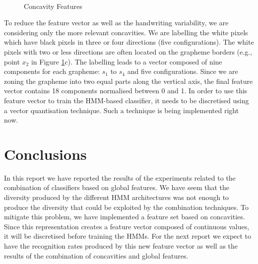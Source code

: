 \documentclass{article}[14pt, oneside, a4paper, times]
\begin{document}
 \begin {figure} [htb]
    \centering
    \mbox
        {
        \quad 
        \quad 
        }
    \caption{Concavity Features \cite{Morita2004}}
    \label{conc:fig}
\end{figure}


To reduce the feature vector as well as the handwriting variability, we are considering only the more relevant concavities. We are labelling the white pixels which have black pixels in three or four directions (five configurations). The white pixels with two or less directions are often located on the grapheme borders (e.g., point $x_2$ in Figure \ref{conc:fig}c). The labelling leads to a vector composed of nine components  for each grapheme: $s_1$ to $s_4$ and five configurations. Since we are zoning the grapheme into two equal parts along the vertical axis, the final feature vector contains 18 components normalised between 0 and 1. In order to use this feature vector to train the HMM-based classifier, it needs to be discretised using a vector quantisation technique. Such a technique is being implemented right now.

\section{Conclusions}

In this report we have reported the results of the experiments related to the combination of classifiers based on global features. We have seem that the diversity produced by the different HMM architectures was not enough to produce the diversity that could be exploited by the combination techniques. To mitigate this problem, we have implemented a feature set based on concavities. Since this representation creates a feature vector composed of continuous values, it will be discretised before training the HMMs. For the next report we expect to have the recognition rates produced by this new feature vector as well as the results of the combination of concavities and global features. 




\end{document}

